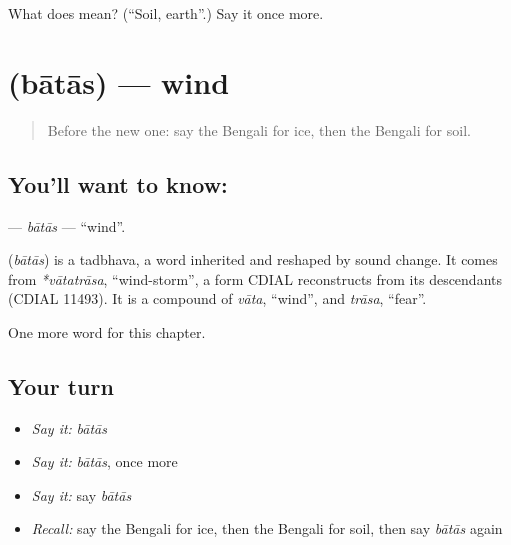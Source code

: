 \begin{tcolorbox}[breakable,colback=teal!4,colframe=teal!35!black,title={Before you move on}]
What does  mean? (\textquotedblleft{}Soil, earth\textquotedblright{}.) Say it once more.
\end{tcolorbox}
\section[\texorpdfstring{\bn{বাতাস} (bātās)}{বাতাস (bātās)}]{ (bātās) — wind}

\label{lesson:BN-C68-batas}



\begin{quote}
Before the new one: say the Bengali for ice, then the Bengali for soil.
\end{quote}

\subsection*{You'll want to know: }
\textbf{} — \emph{bātās} — \textquotedblleft{}wind\textquotedblright{}.

\begin{cousinweb}
\textbf{} (\emph{bātās}) is a tadbhava, a word inherited and reshaped by sound change. It comes from \emph{*vātatrāsa}, \textquotedblleft{}wind-storm\textquotedblright{}, a form CDIAL reconstructs from its descendants (CDIAL 11493). It is a compound of \emph{vāta}, \textquotedblleft{}wind\textquotedblright{}, and \emph{trāsa}, \textquotedblleft{}fear\textquotedblright{}.
\end{cousinweb}

\begin{grammarlens}[title={What you've built}]
One more word for this chapter.
\end{grammarlens}

\subsection*{Your turn}
\begin{itemize}
\raggedright
  \item \emph{Say it:} \emph{bātās}
  \item \emph{Say it:} \emph{bātās}, once more
  \item \emph{Say it:} say \emph{bātās}
  \item \emph{Recall:} say the Bengali for ice, then the Bengali for soil, then say \emph{bātās} again
\end{itemize}

